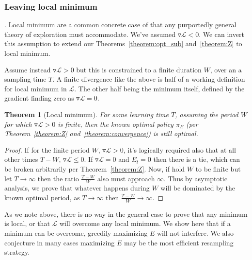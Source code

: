 \documentclass[9pt,twocolumn,twoside]{pnas-new}
\newtheorem{theorem}{Theorem}
\begin{document}
\subsubsection*{Leaving local minimum}.
Local minimum are a common concrete case of that any purportedly general theory of exploration must accommodate. We've assumed $\triangledown \mathcal{L} < 0$. We can invert this assumption to extend our Theorems~\ref{theorem:opt_sub} and~\ref{theorem:Z} to local minimum. 

Assume instead $\triangledown \mathcal{L} > 0$ but this is constrained to a finite duration $W$, over an a sampling time $T$. A finite divergence like the above is half of a working definition for local minimum in $\mathcal{L}$. The other half being the minimum itself, defined by the gradient finding zero as $\triangledown \mathcal{L} = 0$.

\begin{theorem}[Local minimum] \label{theorem:local_min}
    For some learning time $T$, assuming the period $W$ for which $\triangledown \mathcal{L} > 0$ is finite, then the known optimal policy $\pi_E$ (per Theorem~\ref{theorem:Z} and~\ref{theorem:convergence}) is still optimal.
\end{theorem}
\begin{proof}
If for the finite period $W$, $\triangledown \mathcal{L} > 0$, it's logically required also that at all other times $T - W$, $\triangledown \mathcal{L} \leq 0$.  If $\triangledown \mathcal{L} = 0$ and $E_t = 0$ then there is a tie, which can be broken arbitrarily per Theorem~\ref{theorem:Z}. Now, if hold $W$ to be finite but let $T \rightarrow \infty$ then the ratio $\frac{T - W}{W}$ also must approach $\infty$. Thus by asymptotic analysis, we prove that whatever happens during $W$ will be dominated by the known optimal period, as $T \rightarrow \infty$ then $\frac{T - W}{W} \rightarrow \infty$.
\end{proof}

As we note above, there is no way in the general case to prove that any minimum is local, or that $\mathcal{L}$ will overcome any local minimum. We show here that if a minimum can be overcome, greedily maximizing $E$ will not interfere. We also conjecture in many cases maximizing $E$ may be the most efficient resampling strategy. %

\end{document}
